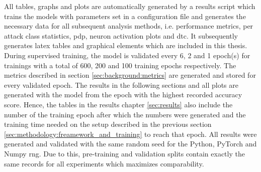 All tables, graphs and plots are automatically generated by a results script which trains the models with parameters set in a configuration file and generates the necessary data for all subsequent analysis methods, i.e. performance metrics, per attack class statistics, \gls{pdp}, neuron activation plots and \gls{dtc}. It subsequently generates latex tables and graphical elements which are included in this thesis. During supervised training, the model is validated every 6, 2 and 1 epoch(s) for trainings with a total of 600, 200 and 100 training epochs respectively. The metrics described in section \ref{sec:background:metrics} are generated and stored for every validated epoch. The results in the following sections and all plots are generated with the model from the epoch with the highest recorded accuracy score. Hence, the tables in the results chapter \ref{sec:results} also include the number of the training epoch after which the numbers were generated and the training time needed on the setup described in the previous section \ref{sec:methodology:freamework_and_training} to reach that epoch.
All results were generated and validated with the same random seed for the Python, PyTorch and Numpy \gls{rng}. Due to this, pre-training and validation splits contain exactly the same records for all experiments which maximizes comparability. 
\newpage